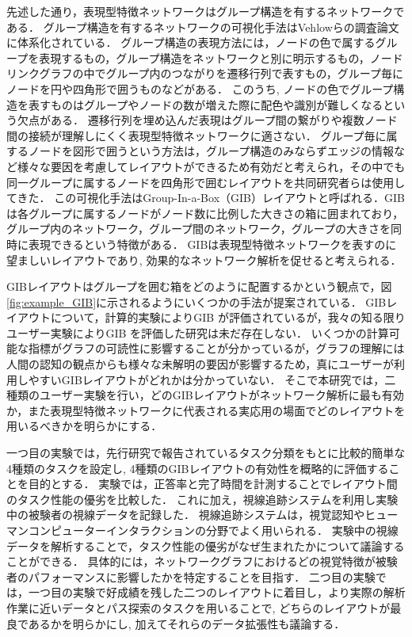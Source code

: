 \documentclass{kuee}
\begin{document}
先述した通り，表現型特徴ネットワークはグループ構造を有するネットワークである．
グループ構造を有するネットワークの可視化手法はVehlowらの調査論文に体系化されている\cite{Vehlow2017VisualizingGS}．
グループ構造の表現方法には，ノードの色で属するグループを表現するもの，グループ構造をネットワークと別に明示するもの，ノードリンクグラフの中でグループ内のつながりを遷移行列で表すもの，グループ毎にノードを円や四角形で囲うものなどがある．
このうち, ノードの色でグループ構造を表すものはグループやノードの数が増えた際に配色や識別が難しくなるという欠点がある．
遷移行列を埋め込んだ表現はグループ間の繋がりや複数ノード間の接続が理解しにくく表現型特徴ネットワークに適さない．
グループ毎に属するノードを図形で囲うという方法は，グループ構造のみならずエッジの情報など様々な要因を考慮してレイアウトができるため有効だと考えられ，その中でも同一グループに属するノードを四角形で囲むレイアウトを共同研究者らは使用してきた．
この可視化手法はGroup-In-a-Box（GIB）レイアウトと呼ばれる．GIB は各グループに属するノードがノード数に比例した大きさの箱に囲まれており，グループ内のネットワーク，グループ間のネットワーク，グループの大きさを同時に表現できるという特徴がある．
GIBは表現型特徴ネットワークを表すのに望ましいレイアウトであり, 効果的なネットワーク解析を促せると考えられる．

GIBレイアウトはグループを囲む箱をどのように配置するかという観点で，図\ref{fig:example_GIB}に示されるようにいくつかの手法が提案されている．
GIBレイアウトについて，計算的実験\cite{chaturvedi2014group,onoue2017optimal}によりGIB が評価されているが，我々の知る限りユーザー実験によりGIB を評価した研究は未だ存在しない．
いくつかの計算可能な指標がグラフの可読性に影響することが分かっている\cite{468391,purchase1997aesthetic,purchase1998performance,purchase2002empirical,giacomo}が，グラフの理解には人間の認知の観点からも様々な未解明の要因が影響するため，真にユーザーが利用しやすいGIBレイアウトがどれかは分かっていない．
そこで本研究では，二種類のユーザー実験を行い，どのGIBレイアウトがネットワーク解析に最も有効か，また表現型特徴ネットワークに代表される実応用の場面でどのレイアウトを用いるべきかを明らかにする．

一つ目の実験では，先行研究\cite{Vehlow2017VisualizingGS,saket2014group}で報告されているタスク分類をもとに比較的簡単な4種類のタスクを設定し, 4種類のGIBレイアウトの有効性を概略的に評価することを目的とする．
実験では，正答率と完了時間を計測することでレイアウト間のタスク性能の優劣を比較した．
これに加え，視線追跡システムを利用し実験中の被験者の視線データを記録した．
視線追跡システムは，視覚認知やヒューマンコンピューターインタラクションの分野でよく用いられる．
実験中の視線データを解析することで，タスク性能の優劣がなぜ生まれたかについて議論することができる\cite{andrienko2012visual,duchowski2007eye,kurzhals2014evaluating}．
具体的には，ネットワークグラフにおけるどの視覚特徴が被験者のパフォーマンスに影響したかを特定することを目指す．
二つ目の実験では，一つ目の実験で好成績を残した二つのレイアウトに着目し，より実際の解析作業に近いデータとパス探索のタスクを用いることで, どちらのレイアウトが最良であるかを明らかにし, 加えてそれらのデータ拡張性も議論する．
\end{document}
